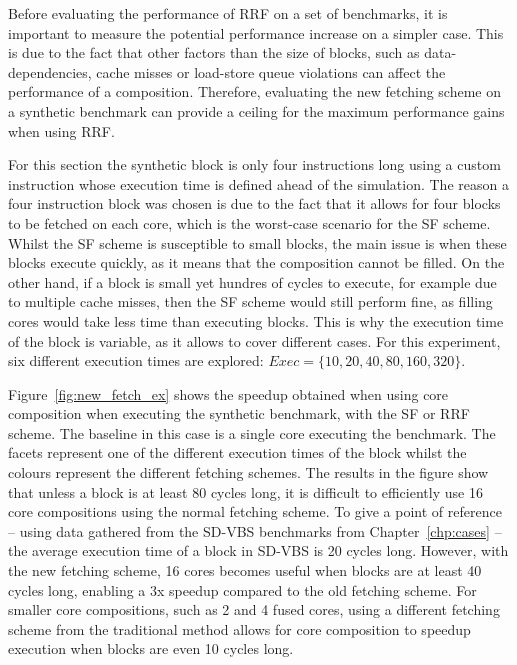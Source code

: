 Before evaluating the performance of RRF on a set of benchmarks, it is important to measure the potential performance increase on a simpler case.
This is due to the fact that other factors than the size of blocks, such as data-dependencies, cache misses or load-store queue violations can affect the performance of a composition.
Therefore, evaluating the new fetching scheme on a synthetic benchmark can provide a ceiling for the maximum performance gains when using RRF.

For this section the synthetic block is only four instructions long using a custom instruction whose execution time is defined ahead of the simulation.
The reason a four instruction block was chosen is due to the fact that it allows for four blocks to be fetched on each core, which is the worst-case scenario for the SF scheme.
Whilst the SF scheme is susceptible to small blocks, the main issue is when these blocks execute quickly, as it means that the composition cannot be filled.
On the other hand, if a block is small yet hundres of cycles to execute, for example due to multiple cache misses, then the SF scheme would still perform fine, as filling cores would take less time than executing blocks.
This is why the execution time of the block is variable, as it allows to cover different cases.
For this experiment, six different execution times are explored: $Exec=\{10,20,40,80,160,320\}$.

Figure~\ref{fig:new_fetch_ex} shows the speedup obtained when using core composition when executing the synthetic benchmark, with the SF or RRF scheme.
The baseline in this case is a single core executing the benchmark.
The facets represent one of the different execution times of the block whilst the colours represent the different fetching schemes.
The results in the figure show that unless a block is at least 80 cycles long, it is difficult to efficiently use 16 core compositions using the normal fetching scheme.
To give a point of reference -- using data gathered from the SD-VBS benchmarks from Chapter~\ref{chp:cases} -- the average execution time of a block in SD-VBS is 20 cycles long.
However, with the new fetching scheme, 16 cores becomes useful when blocks are at least 40 cycles long, enabling a 3x speedup compared to the old fetching scheme.
For smaller core compositions, such as 2 and 4 fused cores, using a different fetching scheme from the traditional method allows for core composition to speedup execution when blocks are even 10 cycles long.

